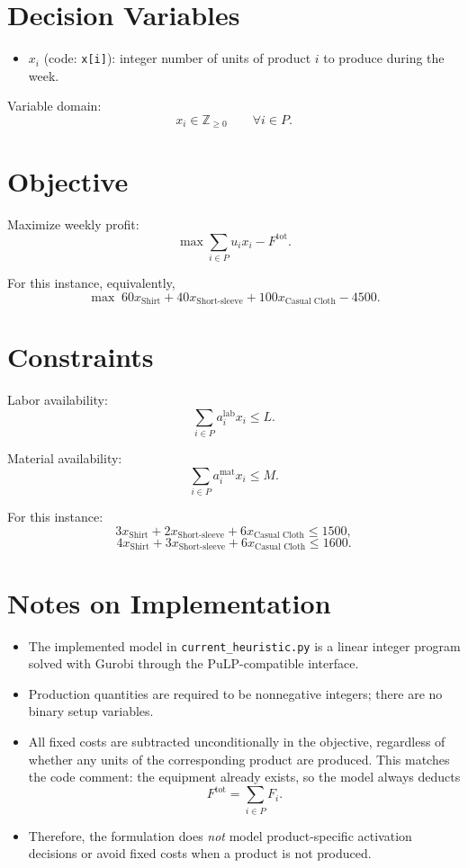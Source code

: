 \section*{Decision Variables}

\begin{itemize}
    \item $x_i$ (code: \texttt{x[i]}): integer number of units of product $i$ to produce during the week.
\end{itemize}

Variable domain:
\[
x_i \in \mathbb{Z}_{\ge 0}\qquad \forall i\in P.
\]

\section*{Objective}

Maximize weekly profit:
\[
\max \sum_{i\in P} u_i x_i - F^{\text{tot}}.
\]

For this instance, equivalently,
\[
\max\; 60x_{\text{Shirt}} + 40x_{\text{Short-sleeve}} + 100x_{\text{Casual Cloth}} - 4500.
\]

\section*{Constraints}

Labor availability:
\[
\sum_{i\in P} a_i^{\text{lab}} x_i \le L.
\]

Material availability:
\[
\sum_{i\in P} a_i^{\text{mat}} x_i \le M.
\]

For this instance:
\[
3x_{\text{Shirt}} + 2x_{\text{Short-sleeve}} + 6x_{\text{Casual Cloth}} \le 1500,
\]
\[
4x_{\text{Shirt}} + 3x_{\text{Short-sleeve}} + 6x_{\text{Casual Cloth}} \le 1600.
\]

\section*{Notes on Implementation}

\begin{itemize}
    \item The implemented model in \texttt{current\_heuristic.py} is a linear integer program solved with Gurobi through the PuLP-compatible interface.
    \item Production quantities are required to be nonnegative integers; there are no binary setup variables.
    \item All fixed costs are subtracted unconditionally in the objective, regardless of whether any units of the corresponding product are produced. This matches the code comment: the equipment already exists, so the model always deducts
    \[
    F^{\text{tot}}=\sum_{i\in P} F_i.
    \]
    \item Therefore, the formulation does \emph{not} model product-specific activation decisions or avoid fixed costs when a product is not produced.
\end{itemize}
